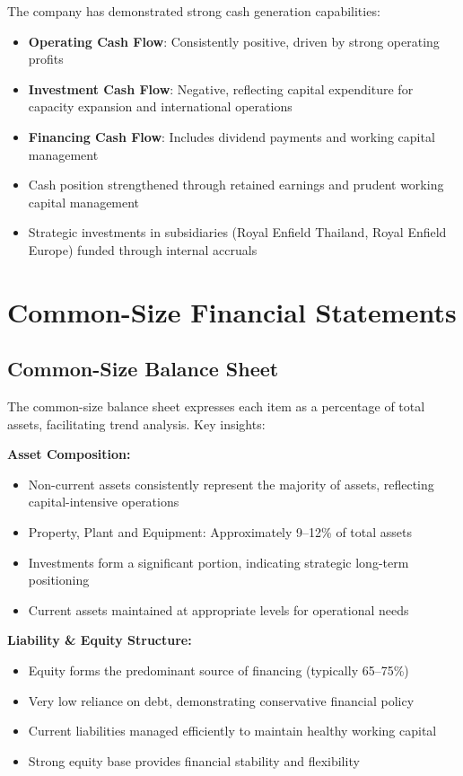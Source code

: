 \documentclass[8pt,a4paper]{article}
\begin{document}
The company has demonstrated strong cash generation capabilities:

\begin{itemize}
    \item \textbf{Operating Cash Flow}: Consistently positive, driven by strong operating profits
    \item \textbf{Investment Cash Flow}: Negative, reflecting capital expenditure for capacity expansion and international operations
    \item \textbf{Financing Cash Flow}: Includes dividend payments and working capital management
    \item Cash position strengthened through retained earnings and prudent working capital management
    \item Strategic investments in subsidiaries (Royal Enfield Thailand, Royal Enfield Europe) funded through internal accruals
\end{itemize}

\section{Common-Size Financial Statements}

\subsection{Common-Size Balance Sheet}

The common-size balance sheet expresses each item as a percentage of total assets, facilitating trend analysis. Key insights:

\textbf{Asset Composition:}
\begin{itemize}
    \item Non-current assets consistently represent the majority of assets, reflecting capital-intensive operations
    \item Property, Plant and Equipment: Approximately 9--12\% of total assets
    \item Investments form a significant portion, indicating strategic long-term positioning
    \item Current assets maintained at appropriate levels for operational needs
\end{itemize}

\textbf{Liability \& Equity Structure:}
\begin{itemize}
    \item Equity forms the predominant source of financing (typically 65--75\%)
    \item Very low reliance on debt, demonstrating conservative financial policy
    \item Current liabilities managed efficiently to maintain healthy working capital
    \item Strong equity base provides financial stability and flexibility
\end{itemize}
\end{document}
